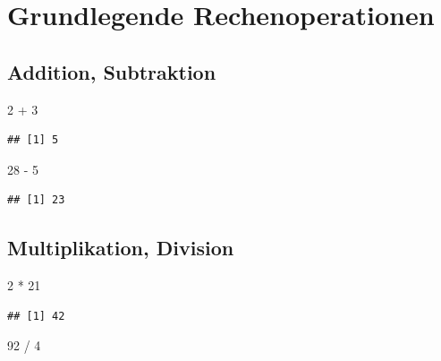 \documentclass[
]{book}
\newenvironment{Shaded}{\begin{snugshade}}{\end{snugshade}}
\newcommand{\DecValTok}[1]{\textcolor[rgb]{0.00,0.00,0.81}{#1}}
\newcommand{\SpecialCharTok}[1]{\textcolor[rgb]{0.00,0.00,0.00}{#1}}
\begin{document}
\hypertarget{grundlegende-rechenoperationen}{%
\section{Grundlegende Rechenoperationen}\label{grundlegende-rechenoperationen}}

\hypertarget{addition-subtraktion}{%
\subsection*{Addition, Subtraktion}\label{addition-subtraktion}}

\begin{Shaded}
\begin{Highlighting}[]
\DecValTok{2} \SpecialCharTok{+} \DecValTok{3}  
\end{Highlighting}
\end{Shaded}

\begin{verbatim}
## [1] 5
\end{verbatim}

\begin{Shaded}
\begin{Highlighting}[]
\DecValTok{28} \SpecialCharTok{{-}} \DecValTok{5}  
\end{Highlighting}
\end{Shaded}

\begin{verbatim}
## [1] 23
\end{verbatim}

\hypertarget{multiplikation-division}{%
\subsection*{Multiplikation, Division}\label{multiplikation-division}}

\begin{Shaded}
\begin{Highlighting}[]
\DecValTok{2} \SpecialCharTok{*} \DecValTok{21}   
\end{Highlighting}
\end{Shaded}

\begin{verbatim}
## [1] 42
\end{verbatim}

\begin{Shaded}
\begin{Highlighting}[]
\DecValTok{92} \SpecialCharTok{/} \DecValTok{4}
\end{Highlighting}
\end{Shaded}
\end{document}
